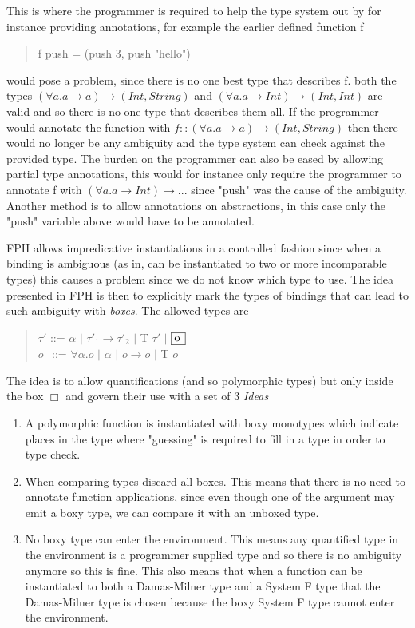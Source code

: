 This is where the programmer is required to help the type system out by for instance providing annotations, for example the earlier defined function f
\begin{quotation}
f push = (push 3, push "hello")
\end{quotation}
would pose a problem, since there is no one best type that describes f.
both the types $(\forall a. a \rightarrow a) \rightarrow (Int, String)$ and $(\forall a. a \rightarrow Int) \rightarrow (Int, Int)$ are valid and so there is no one type that describes them all.
If the programmer would annotate the function with $f::(\forall a. a \rightarrow a) \rightarrow (Int, String)$ then there would no longer be any ambiguity and the type system can check against the provided type.
The burden on the programmer can also be eased by allowing partial type annotations, this would for instance only require the programmer to annotate f with $(\forall a. a \rightarrow Int) \rightarrow ...$ since "push" was the cause of the ambiguity. Another method is to allow annotations on abstractions, in this case only the "push" variable above would have to be annotated.

FPH allows impredicative instantiations in a controlled fashion since when a binding is ambiguous (as in, can be instantiated to two or more incomparable types) this causes a problem since we do not know which type to use. The idea presented in FPH is then to explicitly mark the types of bindings that can lead to such ambiguity with \textit{boxes}. The allowed types are

\begin{quotation}
$\tau'$ ::= $\alpha$ $|$  $\tau'_1 \rightarrow \tau'_2$ $|$ T $\tau'$ $|$ $\framebox[0.45cm][l]{o}$ \\
\indent $o$ $\hspace{1pt}$ ::= $\forall \alpha.o$ $|$ $\alpha$ $|$ $o \rightarrow o$ $|$ T $o$
\end{quotation}

The idea is to allow quantifications (and so polymorphic types) but only inside the box $\Box$ and govern their use with a set of 3 \textit{Ideas}\cite{FPH}

\begin{enumerate}
\item A polymorphic function is instantiated with boxy monotypes which indicate places in the type where "guessing" is required to fill in a type in order to type check.
\item When comparing types discard all boxes. This means that there is no need to annotate function applications, since even though one of the argument may emit a boxy type, we can compare it with an unboxed type.
\item No boxy type can enter the environment. This means any quantified type in the environment is a programmer supplied type and so there is no ambiguity anymore so this is fine. This also means that when a function can be instantiated to both a Damas-Milner type and a System F type that the Damas-Milner type is chosen because the boxy System F type cannot enter the environment.
\end{enumerate}

